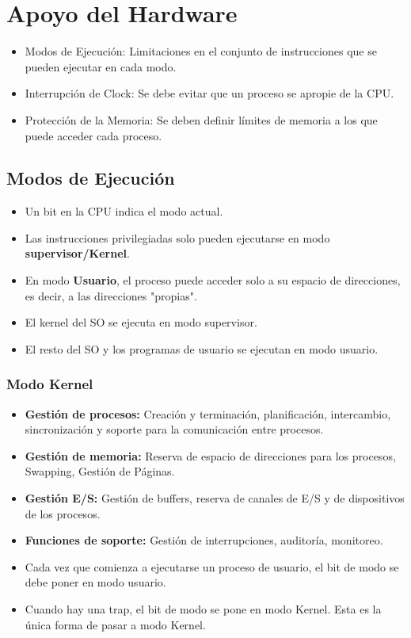 \section{Apoyo del Hardware}
\begin{itemize}
    \item Modos de Ejecución: Limitaciones en el conjunto de instrucciones que se pueden ejecutar en cada modo.
    \item Interrupción de Clock: Se debe evitar que un proceso se apropie de la CPU.
    \item Protección de la Memoria: Se deben definir límites de memoria a los que puede acceder cada proceso.
\end{itemize}

\subsection{Modos de Ejecución}
\begin{itemize}
    \item Un bit en la CPU indica el modo actual.
    \item Las instrucciones privilegiadas solo pueden ejecutarse en modo \textbf{supervisor/Kernel}.
    \item En modo \textbf{Usuario}, el proceso puede acceder solo a su espacio de direcciones, es decir, a las direcciones "propias".
    \item El kernel del SO se ejecuta en modo supervisor.
    \item El resto del SO y los programas de usuario se ejecutan en modo usuario.
\end{itemize}

\subsubsection{Modo Kernel}
\begin{itemize}
    \item \textbf{Gestión de procesos:} Creación y terminación, planificación, intercambio, sincronización y soporte para la comunicación entre procesos.
    \item \textbf{Gestión de memoria:} Reserva de espacio de direcciones para los procesos, Swapping, Gestión de Páginas.
    \item \textbf{Gestión E/S:} Gestión de buffers, reserva de canales de E/S y de dispositivos de los procesos.
    \item \textbf{Funciones de soporte:} Gestión de interrupciones, auditoría, monitoreo.
    \item Cada vez que comienza a ejecutarse un proceso de usuario, el bit de modo se debe poner en modo usuario.
    \item Cuando hay una trap, el bit de modo se pone en modo Kernel. Esta es la única forma de pasar a modo Kernel.
\end{itemize}

